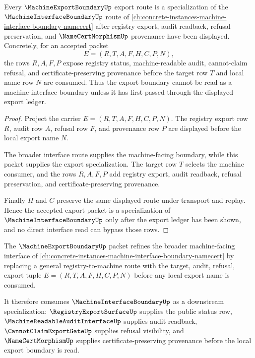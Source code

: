 \begin{theorem}
\label{thm:machine-export-boundary-interface-forward-link}
Every $\MachineExportBoundaryUp$ export route is a specialization of the $\MachineInterfaceBoundaryUp$ route of \autoref{ch:concrete-instances-machine-interface-boundary-namecert} after registry export, audit readback, refusal preservation, and $\NameCertMorphismUp$ provenance have been displayed. Concretely, for an accepted packet
$$
E=(R,T,A,F,H,C,P,N),
$$
the rows $R,A,F,P$ expose registry status, machine-readable audit, cannot-claim refusal, and certificate-preserving provenance before the target row $T$ and local name row $N$ are consumed. Thus the export boundary cannot be read as a machine-interface boundary unless it has first passed through the displayed export ledger.
\end{theorem}
\begin{proof}
Project the carrier $E=(R,T,A,F,H,C,P,N)$. The registry export row $R$, audit row $A$, refusal row $F$, and provenance row $P$ are displayed before the local export name $N$.

The broader interface route supplies the machine-facing boundary, while this packet supplies the export specialization. The target row $T$ selects the machine consumer, and the rows $R,A,F,P$ add registry export, audit readback, refusal preservation, and certificate-preserving provenance.

Finally $H$ and $C$ preserve the same displayed route under transport and replay. Hence the accepted export packet is a specialization of $\MachineInterfaceBoundaryUp$ only after the export ledger has been shown, and no direct interface read can bypass those rows.
\end{proof}

The $\MachineExportBoundaryUp$ packet refines the broader machine-facing interface of \autoref{ch:concrete-instances-machine-interface-boundary-namecert} by replacing a general registry-to-machine route with the target, audit, refusal, export tuple $E=(R,T,A,F,H,C,P,N)$ before any local export name is consumed.

It therefore consumes $\MachineInterfaceBoundaryUp$ as a downstream specialization: $\RegistryExportSurfaceUp$ supplies the public status row, $\MachineReadableAuditInterfaceUp$ supplies audit readback, $\CannotClaimExportGateUp$ supplies refusal visibility, and $\NameCertMorphismUp$ supplies certificate-preserving provenance before the local export boundary is read.

